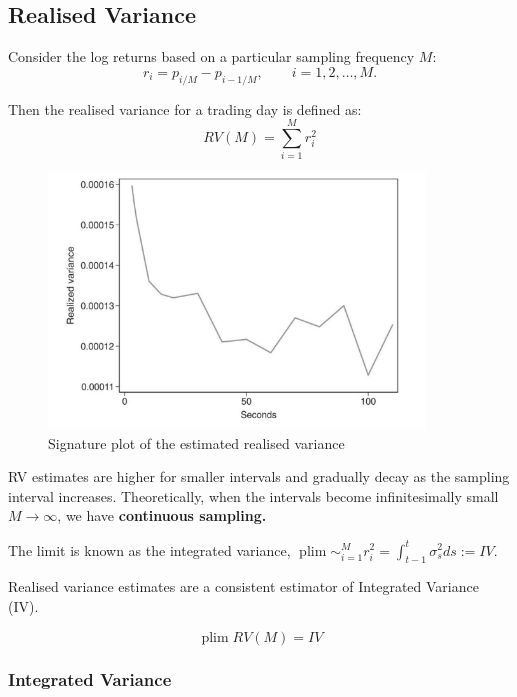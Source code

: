 \documentclass[11pt]{article}
\begin{document}
\subsection{Realised Variance}

\begin{definition}
    Consider the log returns based on a particular sampling frequency $M$:
    \[r_i = p_{i/M} - p_{i-1/M}, \qquad i=1,2,\ldots, M.\]

    Then the realised variance for a trading day is defined as:
    \begin{equation}
        \label{Realised Variance}
        RV(M) = \sum_{i=1}^M r_i^2
    \end{equation}
\end{definition}
\newpage
\begin{figure}[h]
    \centering
    \includegraphics[width=10cm]{pics/RV signature plot.png}
    \caption{Signature plot of the estimated realised variance}
    \label{fig: RV signature}
\end{figure}

RV estimates are higher for smaller intervals and gradually decay as the sampling interval increases. Theoretically, when the intervals become infinitesimally small $M\rightarrow\infty$, we have \textbf{continuous sampling.}

The limit is known as the integrated variance, $\operatorname{plim}\sim_{i=1}^M r_i^2 = \int_{t-1}^t \sigma_s^2 ds:=IV$.

Realised variance estimates are a consistent estimator of Integrated Variance (IV).
\begin{mdframed}
    \[\operatorname{plim} RV(M) = IV\]
\end{mdframed}

\subsubsection{Integrated Variance}
\end{document}
